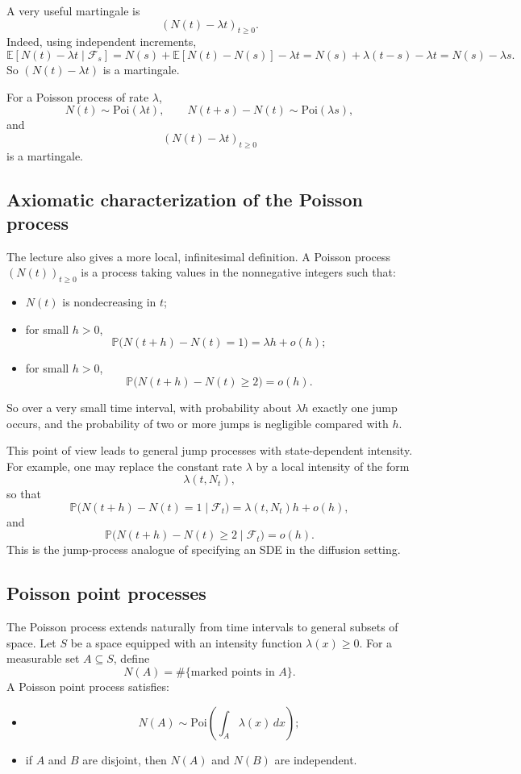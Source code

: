 \documentclass[11pt]{article}
\theoremstyle{definition}
\begin{document}
A very useful martingale is
\[
(N(t)-\lambda t)_{t\ge 0}.
\]
Indeed, using independent increments,
\[
\mathbb E[N(t)-\lambda t\mid \mathcal F_s]
=
N(s)+\mathbb E[N(t)-N(s)]-\lambda t
=
N(s)+\lambda(t-s)-\lambda t
=
N(s)-\lambda s.
\]
So $(N(t)-\lambda t)$ is a martingale.

\begin{keyformula}
For a Poisson process of rate $\lambda$,
\[
N(t)\sim \mathrm{Poi}(\lambda t),
\qquad
N(t+s)-N(t)\sim \mathrm{Poi}(\lambda s),
\]
and
\[
(N(t)-\lambda t)_{t\ge 0}
\]
is a martingale.
\end{keyformula}

\subsection{Axiomatic characterization of the Poisson process}

The lecture also gives a more local, infinitesimal definition. A Poisson process $(N(t))_{t\ge 0}$ is a process taking values in the nonnegative integers such that:
\begin{itemize}[leftmargin=2em]
    \item $N(t)$ is nondecreasing in $t$;
    \item for small $h>0$,
    \[
    \mathbb P\bigl(N(t+h)-N(t)=1\bigr)=\lambda h+o(h);
    \]
    \item for small $h>0$,
    \[
    \mathbb P\bigl(N(t+h)-N(t)\ge 2\bigr)=o(h).
    \]
\end{itemize}

So over a very small time interval, with probability about $\lambda h$ exactly one jump occurs, and the probability of two or more jumps is negligible compared with $h$.

This point of view leads to general jump processes with state-dependent intensity. For example, one may replace the constant rate $\lambda$ by a local intensity of the form
\[
\lambda(t,N_t),
\]
so that
\[
\mathbb P\bigl(N(t+h)-N(t)=1\mid \mathcal F_t\bigr)
=
\lambda(t,N_t)h+o(h),
\]
and
\[
\mathbb P\bigl(N(t+h)-N(t)\ge 2\mid \mathcal F_t\bigr)=o(h).
\]
This is the jump-process analogue of specifying an SDE in the diffusion setting.

\subsection{Poisson point processes}

The Poisson process extends naturally from time intervals to general subsets of space.
Let $S$ be a space equipped with an intensity function $\lambda(x)\ge 0$.
For a measurable set $A\subseteq S$, define
\[
N(A)=\#\{\text{marked points in }A\}.
\]
A Poisson point process satisfies:
\begin{itemize}[leftmargin=2em]
    \item
    \[
    N(A)\sim \mathrm{Poi}\!\left(\int_A \lambda(x)\,dx\right);
    \]
    \item if $A$ and $B$ are disjoint, then $N(A)$ and $N(B)$ are independent.
\end{itemize}
\end{document}
